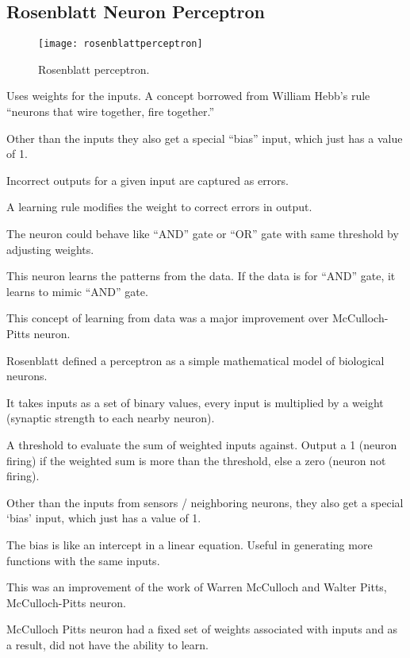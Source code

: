 	\subsection{Rosenblatt Neuron Perceptron}
 	\begin{figure}[htb]
		\centering
		\texttt{[image: rosenblattperceptron]}
		\caption[Rosenblatt perceptron]{Rosenblatt perceptron.}
		\label{fig:rosenblattperceptron}
	\end{figure}
	\begin{bulletedlist}
		\item Uses weights for the inputs.  A concept borrowed from William Hebb's rule ``neurons that wire together, fire together.''
		\item Other than the inputs they also get a special ``bias'' input, which just has a value of 1.
		\item Incorrect outputs for a given input are captured as errors.
		\item A learning rule modifies the weight to correct errors in output.
		\item The neuron could behave like ``AND'' gate or ``OR'' gate with same threshold by adjusting weights.
		\item This neuron learns the patterns from the data. If the data is for ``AND'' gate, it learns to mimic ``AND'' gate.
		\item This concept of learning from data was a major improvement over McCulloch-Pitts neuron.
		\item Rosenblatt defined a perceptron as a simple mathematical model of biological neurons.
		\item It takes inputs as a set of binary values, every input is multiplied by a weight (synaptic strength to each nearby neuron).
		\item A threshold to evaluate the sum of weighted inputs against. Output a 1 (neuron firing) if the weighted sum is more than the threshold, else a zero (neuron not firing).
		\item Other than the inputs from sensors / neighboring neurons, they also get a special `bias' input, which just has a value of 1.
		\item The bias is like an intercept in a linear equation.  Useful in generating more functions with the same inputs.
		\item This was an improvement of the work of Warren McCulloch and Walter Pitts, McCulloch-Pitts neuron.
		\item McCulloch Pitts neuron had a fixed set of weights associated with inputs and as a result, did not have the ability to learn.

\end{bulletedlist}
